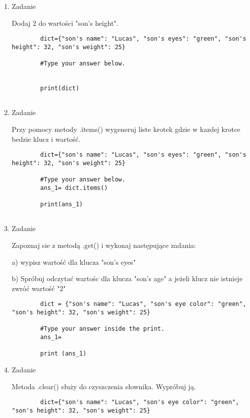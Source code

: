 \documentclass[11pt]{article}
\begin{document}
\begin{enumerate}
	\item 
	\begin{Large}
		Zadanie
	\end{Large}
	\par
	Dodaj 2 do wartości "son's height".
	\begin{lstlisting}
		dict={"son's name": "Lucas", "son's eyes": "green", "son's height": 32, "son's weight": 25}
		
		#Type your answer below.
		
		
		print(dict)
		
	\end{lstlisting}

	\item 
	\begin{Large}
		Zadanie
	\end{Large}
	\par
	Przy pomocy metody .items() wygeneruj liste krotek gdzie w kazdej krotce bedzie klucz i wartość.
	\begin{lstlisting}
		dict={"son's name": "Lucas", "son's eyes": "green", "son's height": 32, "son's weight": 25}
		
		#Type your answer below.
		ans_1= dict.items()
		
		print(ans_1)
		
	\end{lstlisting}
 
 	\item 
 	\begin{Large}
 		Zadanie
 	\end{Large}
 	\par
 	Zapoznaj sie z metodą .get() i wykonaj następujące zadania:
 	\par
 	a) wypisz wartość dla klucza "son's eyes"
 	\par
 	b) Spróbuj odczytać wartośc dla klucza  "son's age" a jeżeli klucz nie istnieje zwróć wartość "2"
 	
 	\begin{lstlisting}
 		dict = {"son's name": "Lucas", "son's eye color": "green", "son's height": 32, "son's weight": 25}
 		
 		#Type your answer inside the print.
 		ans_1=
 		
 		print (ans_1)
 	\end{lstlisting}
 
 \item 
 \begin{Large}
 	Zadanie
 \end{Large}
	\par
	Metoda .clear() służy do czyszczenia słownika. Wypróbuj ją.
	\begin{lstlisting}
		dict={"son's name": "Lucas", "son's eye color": "green", "son's height": 32, "son's weight": 25}
		

\end{lstlisting}
\end{enumerate}
\end{document}
